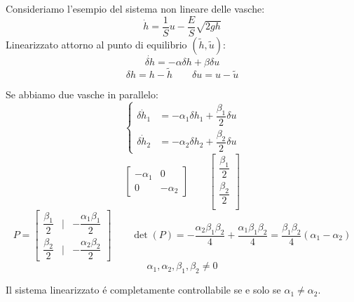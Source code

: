 \documentclass[../main.tex]{subfiles}
\begin{document}
		\begin{Exercise}[title={Studiare la controllabilit\'a di due vasche in parallelo}, difficulty=2]
			Consideriamo l'esempio del sistema non lineare delle vasche:
			\[ \dot h = \dfrac{1}{S}u - \dfrac{E}{S}\sqrt{2gh} \]
			Linearizzato attorno al punto di equilibrio $ (\tilde h, \tilde u) $:
			\[ \dot{\delta h} = -\alpha \delta h + \beta \delta u \]
			\[ \delta h = h - \tilde h \qquad \delta u = u - \tilde u \]
			
			Se abbiamo due vasche in parallelo:
			\[
				\begin{cases}
					\dot{\delta h_1} &= -\alpha_1 \delta h_1 + \dfrac{\beta_1}{2} \delta u\\
					\dot{\delta h_2} &= -\alpha_2 \delta h_2 + \dfrac{\beta_2}{2} \delta u
				\end{cases}
			\]
			\[
				\begin{bmatrix}
					-\alpha_1 & 0\\
					0 & -\alpha_2
				\end{bmatrix} \qquad
				\begin{bmatrix}
					\dfrac{\beta_1}{2}\\
					\dfrac{\beta_2}{2}\\
				\end{bmatrix}
			\]
			\[
				P=
				\begin{bmatrix}
					\dfrac{\beta_1}{2} & | & -\dfrac{\alpha_1 \beta_1}{2}\\
					\dfrac{\beta_2}{2} & | & -\dfrac{\alpha_2 \beta_2}{2}
				\end{bmatrix}\qquad
				\det(P) = -\dfrac{\alpha_2 \beta_1 \beta_2}{4} + \dfrac{\alpha_1 \beta_1 \beta_2}{4} = \dfrac{\beta_1 \beta_2}{4} \left( \alpha_1 - \alpha_2 \right)
			\]
			\[ \alpha_1, \alpha_2, \beta_1, \beta_2 \neq 0 \]
			
			Il sistema linearizzato \'e completamente controllabile se e solo se $ \alpha_1 \neq \alpha_2 $.
		\end{Exercise}
	
\end{document}
